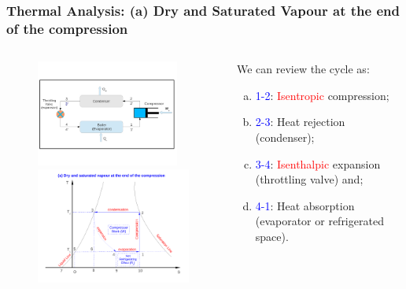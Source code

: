 \documentclass[10pt,compress]{beamer}
\begin{document}
\begin{frame}
 \frametitle{Thermal Analysis: (a) Dry and Saturated Vapour at the end of the compression}
 \begin{columns}
  \begin{column}[c]{0.55\linewidth}
   \begin{figure}%
     \vbox{
      \includegraphics[width=5.cm,height=3.5cm,clip]{./Pics/Overview_Refrig12}
      \vspace{-.6cm}
      \includegraphics[width=5.5cm,height=4.cm,clip]{./Pics/Overview_Refrig14}}
   \end{figure}  
  \end{column}  
  \begin{column}[c]{0.45\linewidth}
   We can review the cycle as:
   \begin{enumerate}[(a)]
    \item <1-> \textcolor{blue}{1-2}: \textcolor{red}{Isentropic} compression;
    \item <2-> \textcolor{blue}{2-3}: Heat rejection (condenser);
    \item <3-> \textcolor{blue}{3-4}: \textcolor{red}{Isenthalpic} expansion (throttling valve) and;
    \item <4-> \textcolor{blue}{4-1}: Heat absorption (evaporator or refrigerated space). 
   \end{enumerate}
  \end{column}  
 \end{columns}
\end{frame}
\end{document}
